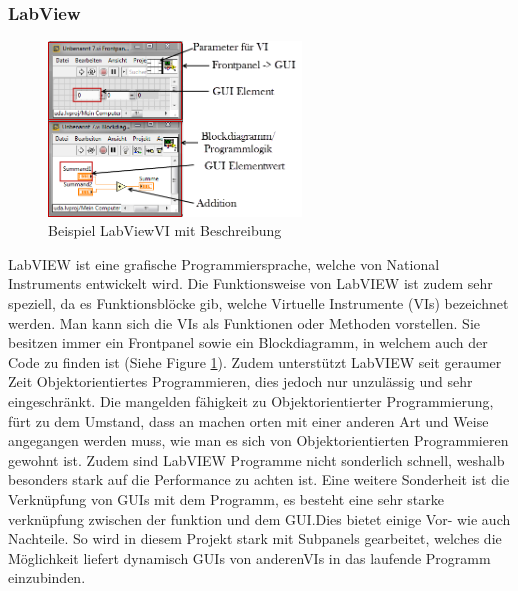 \documentclass[10pt]{scrartcl}
\begin{document}
\subsubsection{LabView}
\begin{figure}
	\begin{center}
		\includegraphics[width=0.6\textwidth]{LabVIEWExample}
		\caption{Beispiel LabView\gls{VI} mit Beschreibung}
		\label{fig:LabViewExample}
	\end{center}
\end{figure}
\gls{LabVIEW} ist eine grafische Programmiersprache, welche von National Instruments entwickelt wird. Die Funktionsweise von \gls{LabVIEW} ist zudem sehr speziell, da es Funktionsblöcke gib, welche Virtuelle Instrumente (\gls{VI}s) bezeichnet werden. Man kann sich die \gls{VI}s als Funktionen oder Methoden vorstellen. Sie besitzen immer ein \gls{Frontpanel} sowie ein \gls{Blockdiagramm}, in welchem auch der Code zu finden ist (Siehe Figure \ref{fig:LabViewExample}). Zudem unterstützt \gls{LabVIEW} seit geraumer Zeit Objektorientiertes Programmieren, dies jedoch nur unzulässig und sehr eingeschränkt.
\newline
Die mangelden fähigkeit zu Objektorientierter Programmierung, fürt zu dem Umstand, dass an machen orten mit einer anderen Art und Weise angegangen werden muss, wie man es sich von Objektorientierten Programmieren gewohnt ist. Zudem sind \gls{LabVIEW} Programme nicht sonderlich schnell, weshalb besonders stark auf die Performance zu achten ist.
\newline
Eine weitere Sonderheit ist die Verknüpfung von GUIs mit dem Programm, es besteht eine sehr starke verknüpfung zwischen der funktion und dem GUI.Dies bietet einige Vor- wie auch Nachteile. So wird in diesem Projekt stark mit \gls{Subpanel}s gearbeitet, welches die Möglichkeit liefert dynamisch GUIs von anderen\gls{VI}s in das laufende Programm einzubinden.  \cite{website:labView} 
\end{document}
